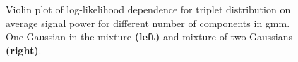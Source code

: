 \begin{figure}[tp]
    \begin{minipage}[h]{0.5\linewidth}
    \end{minipage}
    \begin{minipage}[h]{0.5\linewidth}
    \end{minipage}

    \caption{Violin plot of log-likelihood dependence for triplet distribution on average signal power for different number of components in \gls{gmm}. One Gaussian in the mixture \textbf{(left)} and mixture of two Gaussians \textbf{(right)}.}
    \label{fig:violin_different_mix}
\end{figure}